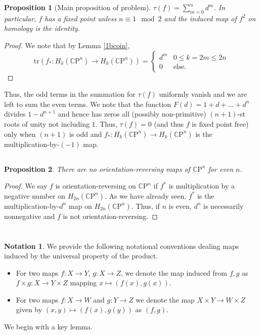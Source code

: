 \documentclass[english]{article}
\newcommand{\CC}{\mathbb{C}}
\newcommand{\prob}[1]{\setcounter{section}{#1-1}\section{}}
\newcommand{\prt}[1]{\setcounter{subsection}{#1-1}\subsection{}}
\newtheorem*{proposition*}{Proposition}
\theoremstyle{remark}
\theoremstyle{definition}
\newtheorem{notation}[theorem]{Notation}
\newcommand{\CP}{{\CC\mathrm{P}}}
\begin{document}
\begin{proposition*}[Main proposition of problem]
	$\tau(f)=\sum_{m=0}^nd^m$. In particular, $f$ has a fixed point unless $n\equiv 1 \mod 2$ and the induced map of $f^2$ on homology is the identity.  
\end{proposition*}
\begin{proof}
	We note that by Lemma \ref{1bcoin}, \begin{equation*}\mathrm{tr}(f_*:H_k(\CP^n)\to H_k(\CP^n))=\begin{cases}
d^m&0\leq k=2m\leq 2n\\0&\text{else}.
	\end{cases}\end{equation*}
\end{proof}
Thus, the odd terms in the summation for $\tau(f)$ uniformly vanish and we are left to sum the even terms. We note that the function $F(d)=1+d+\ldots+d^n$ divides $1-d^{n+1}$ and hence has zeros all (possibly non-primitive) $(n+1)$-st roots of unity not including $1$. Thus, $\tau(f)=0$ (and thus $f$ is fixed point free) only when $(n+1)$ is odd and $f_*:H_k(\CP^n)\to H_k(\CP^n)$ is the multiplication-by-$(-1)$ map. 
\prt{3}
\begin{proposition*}
	There are no orientation-reversing maps of $\CP^n$ for even $n$.
\end{proposition*}
\begin{proof}
We say $f$ is orientation-reversing on $\CP^n$ if $f^*$ is multiplication by a negative number on $H_{2n}(\CP^n)$. As we have already seen, $f^*$ is the multiplication-by-$d^n$ map on $H_{2n}(\CP^n)$. Thus, if $n$ is even, $d^n$ is necessarily nonnegative and $f$ is not orientation-reversing.
\end{proof}
\prob{2}\prt{1}
\begin{notation}
 We provide the following notational conventions dealing maps induced by the universal property of the product.
 \begin{itemize}
 	\item For two maps $f:X\to Y$, $g:X\to Z$, we denote the map induced from $f,g$ as $f\times g:X\to Y\times Z$ mapping $x\mapsto (f(x),g(x))$.
 	\item For two maps $f:X\to  W$ and $g:Y\to Z$ we denote the map $X\times Y\to W\times Z$ given by $(x,y)\mapsto (f(x),g(y))$ as $(f,g)$. 
 \end{itemize}
\end{notation}
We begin with a key lemma.
\end{document}
